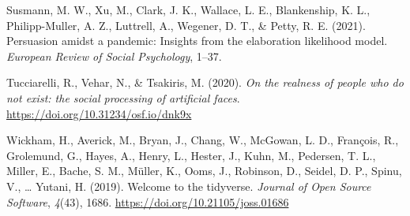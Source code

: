 \documentclass[
  man,floatsintext]{apa6}
\newlength{\cslhangindent}
\newlength{\cslentryspacingunit} %
\newenvironment{CSLReferences}[2] %
 {%
  \setlength{\parindent}{0pt}
  \ifodd #1
  \let\oldpar\par
  \def\par{\hangindent=\cslhangindent\oldpar}
  \fi
  \setlength{\parskip}{#2\cslentryspacingunit}
 }%
 {}
\begin{document}
\begin{CSLReferences}{1}{0}
\leavevmode{}%
Susmann, M. W., Xu, M., Clark, J. K., Wallace, L. E., Blankenship, K. L., Philipp-Muller, A. Z., Luttrell, A., Wegener, D. T., \& Petty, R. E. (2021). Persuasion amidst a pandemic: Insights from the elaboration likelihood model. \emph{European Review of Social Psychology}, 1--37.

\leavevmode{}%
Tucciarelli, R., Vehar, N., \& Tsakiris, M. (2020). \emph{On the realness of people who do not exist: the social processing of artificial faces}. \url{https://doi.org/10.31234/osf.io/dnk9x}

\leavevmode{}%
Wickham, H., Averick, M., Bryan, J., Chang, W., McGowan, L. D., François, R., Grolemund, G., Hayes, A., Henry, L., Hester, J., Kuhn, M., Pedersen, T. L., Miller, E., Bache, S. M., Müller, K., Ooms, J., Robinson, D., Seidel, D. P., Spinu, V., \ldots{} Yutani, H. (2019). Welcome to the {tidyverse}. \emph{Journal of Open Source Software}, \emph{4}(43), 1686. \url{https://doi.org/10.21105/joss.01686}

\end{CSLReferences}


\clearpage
\renewcommand{\listfigurename}{Figure captions}
\end{document}
